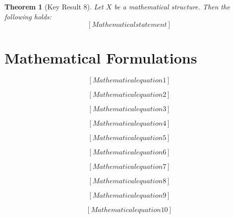 \documentclass[12pt]{article}
\newtheorem{theorem}{Theorem}
\begin{document}
\begin{theorem}[Key Result 8]
Let $X$ be a mathematical structure. Then the following holds:
\begin{equation}
\label{eq:theorem_8}
[Mathematical statement]
\end{equation}
\end{theorem}



\section{Mathematical Formulations}

\begin{equation}
\label{eq:form_1}
[Mathematical equation 1]
\end{equation}

\begin{equation}
\label{eq:form_2}
[Mathematical equation 2]
\end{equation}

\begin{equation}
\label{eq:form_3}
[Mathematical equation 3]
\end{equation}

\begin{equation}
\label{eq:form_4}
[Mathematical equation 4]
\end{equation}

\begin{equation}
\label{eq:form_5}
[Mathematical equation 5]
\end{equation}

\begin{equation}
\label{eq:form_6}
[Mathematical equation 6]
\end{equation}

\begin{equation}
\label{eq:form_7}
[Mathematical equation 7]
\end{equation}

\begin{equation}
\label{eq:form_8}
[Mathematical equation 8]
\end{equation}

\begin{equation}
\label{eq:form_9}
[Mathematical equation 9]
\end{equation}

\begin{equation}
\label{eq:form_10}
[Mathematical equation 10]
\end{equation}
\end{document}
